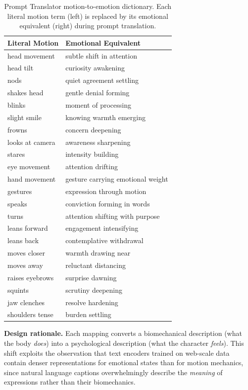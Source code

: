 \documentclass[10pt,twocolumn,letterpaper]{article}
\begin{document}
\begin{table}[t]
\centering
\small
\caption{Prompt Translator motion-to-emotion dictionary. Each literal motion term (left) is replaced by its emotional equivalent (right) during prompt translation.}
\label{tab:pt_dictionary}
\begin{tabular}{p{2.8cm}p{4.2cm}}
\toprule
\textbf{Literal Motion} & \textbf{Emotional Equivalent} \\
\midrule
head movement & subtle shift in attention \\
head tilt & curiosity awakening \\
nods & quiet agreement settling \\
shakes head & gentle denial forming \\
blinks & moment of processing \\
slight smile & knowing warmth emerging \\
frowns & concern deepening \\
looks at camera & awareness sharpening \\
stares & intensity building \\
eye movement & attention drifting \\
hand movement & gesture carrying emotional weight \\
gestures & expression through motion \\
speaks & conviction forming in words \\
turns & attention shifting with purpose \\
leans forward & engagement intensifying \\
leans back & contemplative withdrawal \\
moves closer & warmth drawing near \\
moves away & reluctant distancing \\
raises eyebrows & surprise dawning \\
squints & scrutiny deepening \\
jaw clenches & resolve hardening \\
shoulders tense & burden settling \\
\bottomrule
\end{tabular}
\end{table}

\textbf{Design rationale.} Each mapping converts a biomechanical description (what the body \emph{does}) into a psychological description (what the character \emph{feels}). This shift exploits the observation that text encoders trained on web-scale data contain denser representations for emotional states than for motion mechanics, since natural language captions overwhelmingly describe the \emph{meaning} of expressions rather than their biomechanics.
\end{document}
